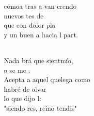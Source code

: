 \documentclass[12pt]{article}
\begin{document}
\begin{multicols*}{2}
\begin{cancion}
	cómoa tras a van crendo  \\
	nuevos tes de  \\
	que con dolor pla \\
	y un buen a hacia l part.  \\\jump\\
	\begin{chorus}%
	Nada brá que sientmío,\\
	o se me .\\
	Acepta a aquel quelega como  \\
	 habré de olvar  \\
	lo que dijo l:\\
	"siendo res,  reino tendis"\\
	\end{chorus}%
	\jump\\
\end{cancion}%


\end{multicols*}
\end{document}
